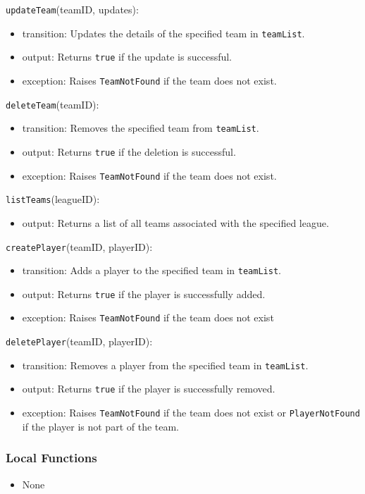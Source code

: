\documentclass[12pt, titlepage]{article}
\begin{document}
\noindent \texttt{updateTeam}(teamID, updates):  
\begin{itemize}
    \item transition: Updates the details of the specified team in \texttt{teamList}.
    \item output: Returns \texttt{true} if the update is successful.
    \item exception: Raises \texttt{TeamNotFound} if the team does not exist.
\end{itemize}

\noindent \texttt{deleteTeam}(teamID):  
\begin{itemize}
    \item transition: Removes the specified team from \texttt{teamList}.
    \item output: Returns \texttt{true} if the deletion is successful.
    \item exception: Raises \texttt{TeamNotFound} if the team does not exist.
\end{itemize}

\noindent \texttt{listTeams}(leagueID):  
\begin{itemize}
    \item output: Returns a list of all teams associated with the specified league.
\end{itemize}

\noindent \texttt{createPlayer}(teamID, playerID):  
\begin{itemize}
    \item transition: Adds a player to the specified team in \texttt{teamList}.
    \item output: Returns \texttt{true} if the player is successfully added.
    \item exception: Raises \texttt{TeamNotFound} if the team does not exist
\end{itemize}

\noindent \texttt{deletePlayer}(teamID, playerID):  
\begin{itemize}
    \item transition: Removes a player from the specified team in \texttt{teamList}.
    \item output: Returns \texttt{true} if the player is successfully removed.
    \item exception: Raises \texttt{TeamNotFound} if the team does not exist or \texttt{PlayerNotFound} if the player is not part of the team.
\end{itemize}

\subsubsection{Local Functions}
\begin{itemize}
    \item None
\end{itemize}
\end{document}

